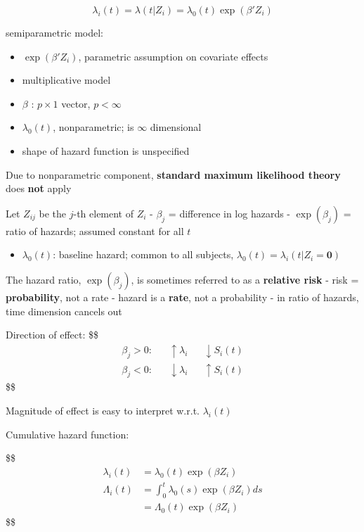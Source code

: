 \documentclass[
]{book}
\providecommand{\tightlist}{%
  \setlength{\itemsep}{0pt}\setlength{\parskip}{0pt}}
\theoremstyle{definition}
\theoremstyle{definition}
\theoremstyle{definition}
\theoremstyle{definition}
\theoremstyle{remark}
\begin{document}
\[
\lambda_i (t) = \lambda (t \vert Z_i ) = \lambda_0 (t) \exp (\beta' Z_i) \tag{Cox Model}
\]

semiparametric model:

\begin{itemize}
\tightlist
\item
  \(\exp(\beta ' Z_i)\), parametric assumption on covariate effects
\item
  multiplicative model
\item
  \(\beta\) : \(p \times 1\) vector, \(p < \infty\)
\item
  \(\lambda_0(t)\), nonparametric; is \(\infty\) dimensional
\item
  shape of hazard function is unspecified
\end{itemize}

Due to nonparametric component, \textbf{standard maximum likelihood theory} does \textbf{not} apply

Let \(Z_{ij}\) be the \(j\)-th element of \(Z_i\)
- \(\beta_j\) = difference in log hazards
- \(\exp(\beta_j)\) = ratio of hazards; assumed constant for all \(t\)

\begin{itemize}
\tightlist
\item
  \(\lambda_0(t)\): baseline hazard; common to all subjects, \(\lambda_0(t) = \lambda_i(t \big | Z_i = \mathbf 0)\)
\end{itemize}

The hazard ratio, \(\exp(\beta_j)\), is sometimes referred to as a \textbf{relative risk}
- risk = \textbf{probability}, not a rate
- hazard is a \textbf{rate}, not a probability
- in ratio of hazards, time dimension cancels out

Direction of effect:
\$\$
\begin{align}

\beta_j > 0: &&\uparrow\lambda_i &&\downarrow S_i(t)
\\
\beta_j < 0: &&\downarrow\lambda_i &&\uparrow S_i(t)


\end{align}
\$\$

Magnitude of effect is easy to interpret w.r.t. \(\lambda_i(t)\)

Cumulative hazard function:

\$\$
\begin{align}

\lambda_i (t) &= \lambda_0(t) \exp(\beta Z_i)
\\
\Lambda_i (t) &= \int_0^t \lambda_0(s) \exp(\beta Z_i) ds
\\
&= \Lambda_0(t) \exp(\beta Z_i)

\end{align}
\$\$
\end{document}
